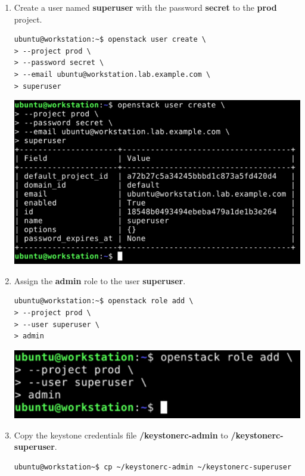 \documentclass[letterpaper, 12pt]{article}
\begin{document}
\begin{enumerate}
    \item Create a user named \textbf{superuser} with the password \textbf{secret} to the \textbf{prod} project.
\begin{lstlisting}
ubuntu@workstation:~$ openstack user create \
> --project prod \
> --password secret \
> --email ubuntu@workstation.lab.example.com \
> superuser
\end{lstlisting}

\begin{center}
    \includegraphics[width=\linewidth]{images/part1/step4.png}
\end{center}

    \item Assign the \textbf{admin} role to the user \textbf{superuser}.
\begin{lstlisting}
ubuntu@workstation:~$ openstack role add \
> --project prod \
> --user superuser \
> admin
\end{lstlisting}

    \begin{center}
        \includegraphics[width=\linewidth]{images/part1/step5.png}
    \end{center}

    \item Copy the keystone credentials file \textbf{\texttildemid/keystonerc-admin} to
    \textbf{\texttildemid/keystonerc-superuser}.
\begin{lstlisting}
ubuntu@workstation~$ cp ~/keystonerc-admin ~/keystonerc-superuser
\end{lstlisting}


\end{enumerate}
\end{document}

